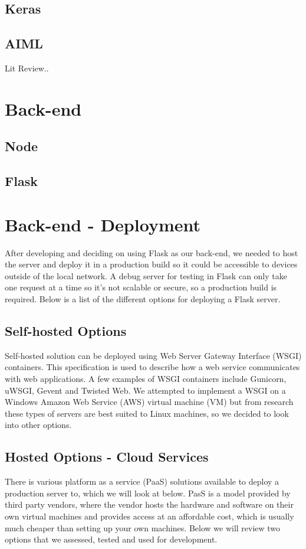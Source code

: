 \subsection{Keras}
\subsection{AIML}
Lit Review..

\section{Back-end}
\subsection{Node}
\subsection{Flask}

\section{Back-end - Deployment}
After developing and deciding on using Flask as our back-end, we needed to host the server and deploy it in a production build so it could be accessible to devices outside of the local network. A debug server for testing in Flask can only take one request at a time so it's not scalable or secure, so a production build is required. Below is a list of the different options for deploying a Flask server.

\subsection{Self-hosted Options}
Self-hosted solution can be deployed using Web Server Gateway Interface (WSGI) containers. This specification is used to describe how a web service communicates with web applications. A few examples of WSGI containers include Gunicorn, uWSGI, Gevent and Twisted Web. We attempted to implement a WSGI on a Windows Amazon Web Service (AWS) virtual machine (VM) but from research these types of servers are best suited to Linux machines, so we decided to look into other options.

\subsection{Hosted Options - Cloud Services}
There is various platform as a service (PaaS) solutions available to deploy a production server to, which we will look at below. PasS is a model provided by third party vendors, where the vendor hosts the hardware and software on their own virtual machines and provides access at an affordable cost, which is usually much cheaper than setting up your own machines. Below we will review two options that we assessed, tested and used for development.

